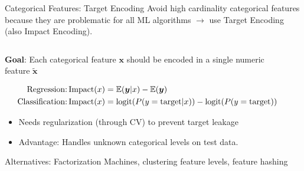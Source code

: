 \begin{frame}{Categorical Features: Target Encoding}
  Avoid high cardinality categorical features because they are problematic for all ML algorithms $\rightarrow$ use Target Encoding (also Impact Encoding).
  \begin{columns}
    \begin{column}{0.7\textwidth}


      \textbf{Goal}: Each categorical feature $\bm{x}$ should be encoded in a single numeric feature $\tilde{\bm{x}}$
      
      \vspace*{-0.5cm}  
      {\footnotesize
      \begin{align*}
      \text{Regression:} \operatorname{Impact}(x) &= \operatorname*{\mathbb{E}}(\bm{y} | x) - \operatorname*{\mathbb{E}}(\bm{y}) \\
      \text{Classification:} \operatorname{Impact}(x) &= \operatorname{logit}(P( y = \text{target} | x)) - \operatorname{logit}(P( y = \text{target}))
      \end{align*}
      }
      \vspace*{-0.5cm}  
      \begin{itemize}
        \item Needs regularization (through CV) to prevent target leakage 
        \item Advantage: Handles unknown categorical levels on test data.
      \end{itemize}
      Alternatives: Factorization Machines, clustering feature levels, feature hashing
    \end{column}%
    \begin{column}{0.3\textwidth}
      \vspace{-1cm}
      \begin{center}
\end{center}
\end{column}
\end{columns}
\end{frame}
